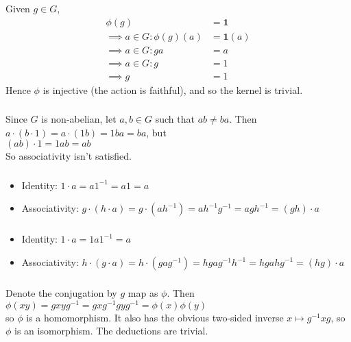 \documentclass{article}
\newcommand{\inv}[1]{ {#1}^{-1} }
\newcommand{\id}{ \bm{1} }
\begin{document}
\subsubsection{}\label{ex7p13}
Given $g\in G$,
\begin{align*}
\phi(g) &= \id\\
\implies a\in G: \phi(g)(a) &= \id(a)\\
\implies a\in G: ga &= a\\
\implies a\in G: g&= 1\\
\implies g &= 1
\end{align*}
Hence $\phi$ is injective (the action is faithful), and so the kernel is trivial.
\subsubsection{}\label{ex7p14}
Since $G$ is non-abelian, let $a,b \in G$ such that $ab \neq ba$. Then\\
$a\cdot(b\cdot 1) = a\cdot(1b) = 1ba = ba$, but\\
$(ab)\cdot 1 = 1ab = ab$\\
So associativity isn't satisfied.
\subsubsection{}\label{ex7p15}
\begin{itemize}
\item Identity: $1\cdot a = a\inv{1} = a1 = a$
\item Associativity: $g\cdot(h\cdot a) = g\cdot(a\inv{h})=a\inv{h}\inv{g} = a\inv{gh} = (gh)\cdot a$
\end{itemize}
\subsubsection{}\label{ex7p16}
\begin{itemize}
\item Identity: $1\cdot a = 1a\inv{1} = a$
\item Associativity: $h\cdot(g\cdot a) = h\cdot (ga\inv{g}) = hga\inv{g}\inv{h} = hga\inv{hg} = (hg)\cdot a$
\end{itemize}
\subsubsection{}\label{ex7p17}
Denote the conjugation by $g$ map as $\phi$. Then\\
$\phi(xy)=gxy\inv{g}=gx\inv{g}gy\inv{g}=\phi(x)\phi(y)$\\
so $\phi$ is a homomorphism. It also has the obvious two-sided inverse $x \mapsto \inv{g}xg$, so $\phi$ is an isomorphism. The deductions are trivial.
\end{document}

